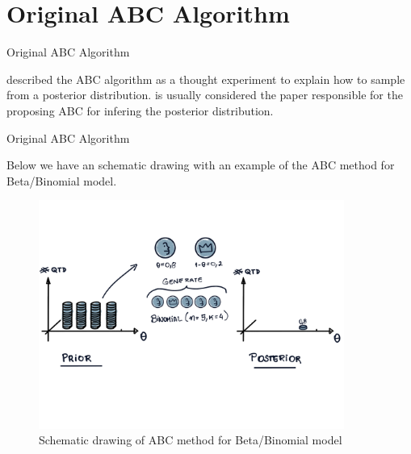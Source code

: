 \documentclass[10pt]{beamer}
\begin{document}
\AtBeginSection{}
\section[Original]{Original ABC Algorithm}
\begin{frame}[fragile]{Original ABC Algorithm}

  \citet{Rubin1984} described the ABC algorithm as a thought experiment
  to explain how to sample from a posterior distribution.
  \citet{Tavare505} is usually considered the paper responsible for the
  proposing ABC for infering the posterior distribution.

  \vspace{1cm}

\begin{algorithm}[H]
\SetAlgoLined
{}
 \caption{Original ABC method}
\end{algorithm}


\end{frame}

\begin{frame}[fragile]{Original ABC Algorithm}

  Below we have an schematic drawing with an example of
  the ABC method for Beta/Binomial model.
    \begin{figure}[H]
        \centering
        \includegraphics[width=10cm]{images/Vis-ABC.png}
        \caption{Schematic drawing of ABC method for Beta/Binomial
        model
        }
    \end{figure}

\end{frame}
\end{document}
